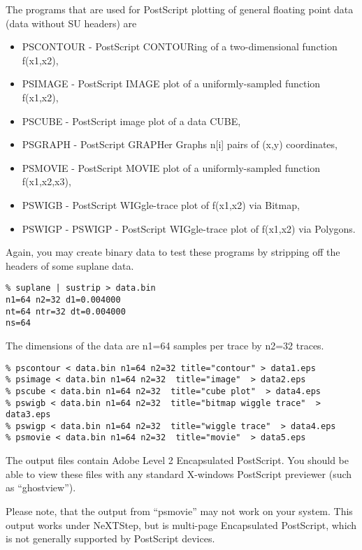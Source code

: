 {{{{{The programs that are used for PostScript plotting of general
floating point data (data without SU headers) are
\begin{itemize}
\item PSCONTOUR - PostScript CONTOURing of a two-dimensional function f(x1,x2),
\item PSIMAGE - PostScript IMAGE plot of a uniformly-sampled function f(x1,x2),
\item PSCUBE - PostScript image plot of a data CUBE,
\item PSGRAPH - PostScript GRAPHer Graphs n[i] pairs of (x,y) coordinates,
\item PSMOVIE - PostScript MOVIE plot of a uniformly-sampled function f(x1,x2,x3),
\item PSWIGB - PostScript WIGgle-trace plot of f(x1,x2) via Bitmap,
\item PSWIGP - PSWIGP - PostScript WIGgle-trace plot of f(x1,x2) via Polygons.
\end{itemize}

Again, you may create binary data to test these programs by stripping
off the headers of some suplane data.
{\small\begin{verbatim}
% suplane | sustrip > data.bin
n1=64 n2=32 d1=0.004000
nt=64 ntr=32 dt=0.004000
ns=64
\end{verbatim}\noindent
The dimensions of the data are n1=64 samples per trace by n2=32 traces.
{\small\begin{verbatim}
% pscontour < data.bin n1=64 n2=32 title="contour" > data1.eps
% psimage < data.bin n1=64 n2=32  title="image"  > data2.eps
% pscube < data.bin n1=64 n2=32  title="cube plot"  > data4.eps
% pswigb < data.bin n1=64 n2=32  title="bitmap wiggle trace"  > data3.eps
% pswigp < data.bin n1=64 n2=32  title="wiggle trace"  > data4.eps
% psmovie < data.bin n1=64 n2=32  title="movie"  > data5.eps
\end{verbatim}}\noindent
The output files contain Adobe Level 2 Encapsulated PostScript.
You should be able to view these files with any standard X-windows
PostScript previewer (such as ``ghostview'').

Please note, that the output from ``psmovie'' may not work on your
system. This output works under NeXTStep, but is multi-page Encapsulated
PostScript, which is not generally supported by PostScript devices.

}}}}}}
